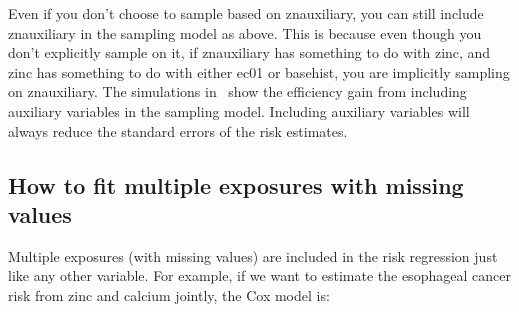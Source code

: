 \documentclass[10pt]{article}
\begin{document}
Even if you don't choose to sample based on znauxiliary, you can still include znauxiliary
in the sampling model as above.  This is because even though you don't explicitly sample
on it, if znauxiliary has something to do with zinc, and zinc has something to do with
either ec01 or basehist, you are implicitly sampling on znauxiliary.  The simulations
in~\cite{Mark:Katki:06} show the efficiency gain from including auxiliary variables in the
sampling model.  Including auxiliary variables will always reduce the standard errors of
the risk estimates.


\subsection{How to fit multiple exposures with missing values}
\label{sec:how-fit-multiple}

Multiple exposures (with missing values) are included in the risk regression just like any
other variable.  For example, if we want to estimate the esophageal cancer risk from zinc
and calcium jointly, the Cox model is:
\end{document}
